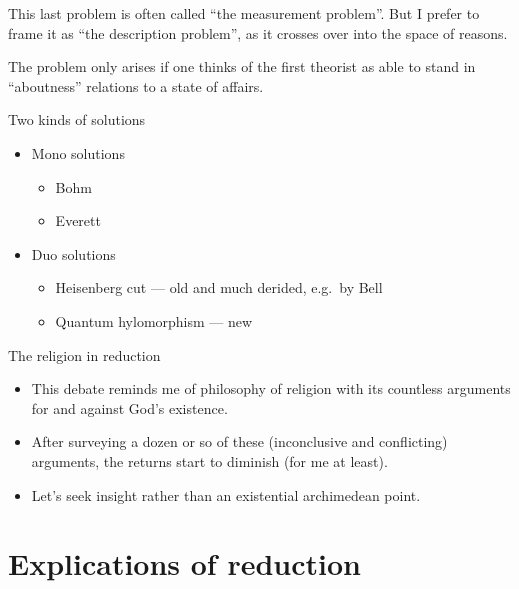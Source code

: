 \documentclass[fleqn]{beamer}
\begin{document}
\begin{frame}

  This last problem is often called ``the measurement problem''. But I
  prefer to frame it as ``the description problem'', as it crosses
  over into the space of reasons.

  The problem only arises if one thinks of the first theorist as able
  to stand in ``aboutness'' relations to a state of affairs.

\end{frame}

\begin{frame}{Two kinds of solutions}

  \begin{itemize}
  \item Mono solutions
    \begin{itemize}
    \item Bohm
    \item Everett
    \end{itemize}  
  \item Duo solutions
  \begin{itemize}  
  \item Heisenberg cut --- old and much derided, e.g.\ by Bell
  \item Quantum hylomorphism --- new
  \end{itemize}
\end{itemize}

\end{frame}

\begin{frame}{The religion in reduction}

  \begin{itemize}
  \item This debate reminds me of philosophy of religion with its
    countless arguments for and against God's existence.
  \item After surveying a dozen or so of these (inconclusive and
    conflicting) arguments, the returns start to diminish (for me at
    least).
  \item Let's seek insight rather than an existential archimedean
    point. \end{itemize}

\end{frame}


\section{Explications of reduction}
\end{document}

